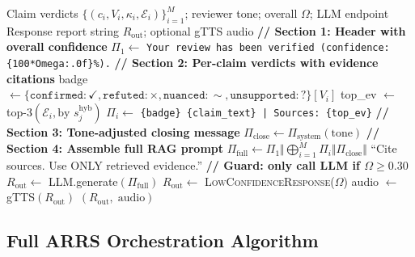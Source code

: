 \documentclass[12pt,a4paper]{article}
\theoremstyle{definition}
\theoremstyle{plain}
\theoremstyle{remark}
\begin{document}
\begin{algorithm}[H]
\caption{ARRS Stage 5 --- Tone-Adaptive Response Report Generation}
\label{alg:arrs_generate}
\begin{algorithmic}[1]
\Require Claim verdicts $\{(c_i, V_i, \kappa_i, \mathcal{E}_i)\}_{i=1}^M$;
         reviewer tone; overall $\Omega$; LLM endpoint
\Ensure Response report string $R_{\text{out}}$; optional gTTS audio
\State \textbf{// Section 1: Header with overall confidence}
\State $\Pi_1 \gets$ \texttt{Your review has been verified (confidence: \{100*Omega:.0f\}\%).}
\State \textbf{// Section 2: Per-claim verdicts with evidence citations}
  \State badge $\gets \{\mathtt{confirmed}: \checkmark, \mathtt{refuted}: \times, 
         \mathtt{nuanced}: \sim, \mathtt{unsupported}: ?\}[V_i]$
  \State top\_ev $\gets$ top-3$(\mathcal{E}_i, \text{by } s_j^{\text{hyb}})$
  \State $\Pi_i \gets$ \texttt{\{badge\} \{claim\_text\} | Sources: \{top\_ev\}}
\EndFor
\State \textbf{// Section 3: Tone-adjusted closing message}
\State $\Pi_{\text{close}} \gets \Pi_{\text{system}}(\text{tone})$ 
\State \textbf{// Section 4: Assemble full RAG prompt}
\State $\Pi_{\text{full}} \gets \Pi_1 \Vert \bigoplus_{i=1}^M \Pi_i \Vert \Pi_{\text{close}} \Vert$
       ``Cite sources. Use ONLY retrieved evidence.''
\State \textbf{// Guard: only call LLM if $\Omega \ge 0.30$}
  \State $R_{\text{out}} \gets$ LLM.generate$(\Pi_{\text{full}})$
\Else
  \State $R_{\text{out}} \gets$ \textsc{LowConfidenceResponse}($\Omega$)
\EndIf
{}
  \State audio $\gets$ gTTS$(R_{\text{out}})$ 
\EndIf
\State \Return $(R_{\text{out}},\; \text{audio})$
\end{algorithmic}
\end{algorithm}

\subsection{Full ARRS Orchestration Algorithm}
\label{sec:arrs_full}
\end{document}
